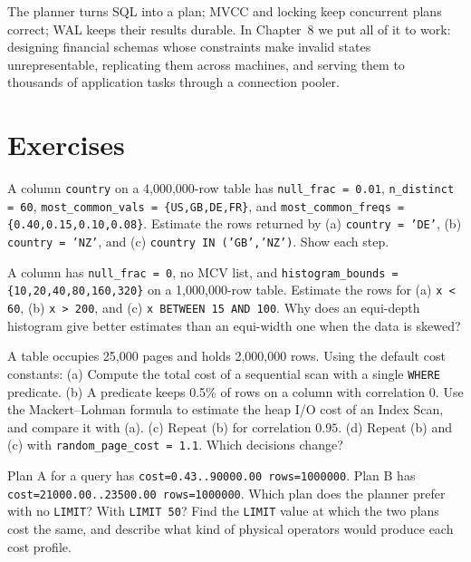 The planner turns SQL into a plan; MVCC and locking keep concurrent plans correct; WAL keeps their results durable. In Chapter~8 we put all of it to work: designing financial schemas whose constraints make invalid states unrepresentable, replicating them across machines, and serving them to thousands of application tasks through a connection pooler.

\section{Exercises}
\label{ch07:exercises}

\begin{exercise}
A column \texttt{country} on a 4,000,000-row table has \texttt{null\_frac = 0.01}, \texttt{n\_distinct = 60}, \texttt{most\_common\_vals = \{US,GB,DE,FR\}}, and \texttt{most\_common\_freqs = \{0.40,0.15,0.10,0.08\}}. Estimate the rows returned by (a) \texttt{country = 'DE'}, (b) \texttt{country = 'NZ'}, and (c) \texttt{country IN ('GB','NZ')}. Show each step.
\end{exercise}

\begin{exercise}
A column has \texttt{null\_frac = 0}, no MCV list, and \texttt{histogram\_bounds = \{10,20,40,80,160,320\}} on a 1,000,000-row table. Estimate the rows for (a) \texttt{x < 60}, (b) \texttt{x > 200}, and (c) \texttt{x BETWEEN 15 AND 100}. Why does an equi-depth histogram give better estimates than an equi-width one when the data is skewed?
\end{exercise}

\begin{exercise}
A table occupies 25,000 pages and holds 2,000,000 rows. Using the default cost constants:
(a) Compute the total cost of a sequential scan with a single \texttt{WHERE} predicate.
(b) A predicate keeps 0.5\% of rows on a column with correlation $0$. Use the Mackert--Lohman formula to estimate the heap I/O cost of an Index Scan, and compare it with (a).
(c) Repeat (b) for correlation $0.95$.
(d) Repeat (b) and (c) with \texttt{random\_page\_cost = 1.1}. Which decisions change?
\end{exercise}

\begin{exercise}
Plan A for a query has \texttt{cost=0.43..90000.00 rows=1000000}. Plan B has \texttt{cost=21000.00..23500.00 rows=1000000}. Which plan does the planner prefer with no \texttt{LIMIT}? With \texttt{LIMIT 50}? Find the \texttt{LIMIT} value at which the two plans cost the same, and describe what kind of physical operators would produce each cost profile.
\end{exercise}

